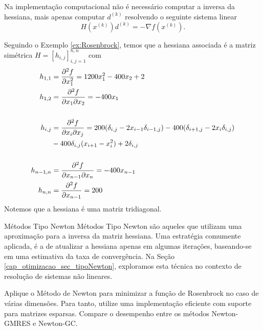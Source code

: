 \begin{obs}
  Na implementação computacional não é necessário computar a inversa da hessiana, mais apenas computar $d^{(k)}$ resolvendo o seguinte sistema linear
  \begin{equation}
    H(x^{(k)})d^{(k)} = -\nabla f(x^{(k)}).
  \end{equation}
\end{obs}

\begin{ex}\label{ex:optNewtonGC}
  Seguindo o Exemplo \ref{ex:Rosenbrock}, temos que a hessiana associada é a matriz simétrica $H = [h_{i,j}]_{i,j=1}^{n,n}$ com
  \begin{align}
    h_{1,1} &= \frac{\partial^2 f}{\partial x_1^2} = 1200x_1^2-400x_2+2\\
    h_{1,2} &= \frac{\partial^2 f}{\partial x_1\partial x_2} = -400x_1\\
            &~\nonumber\\
    h_{i,j} &= \frac{\partial^2 f}{\partial x_i\partial x_j} = 200(\delta_{i,j}-2x_{i-1}\delta_{i-1,j}) - 400(\delta_{i+1,j}-2x_i\delta_{i,j})\nonumber\\
            &- 400\delta_{i,j}(x_{i+1}-x_i^2) + 2\delta_{i,j}\\
            &~\nonumber\\
    h_{n-1,n} &= \frac{\partial^2 f}{\partial x_{n-1}\partial x_n} = -400x_{n-1}\\
    h_{n,n} &= \frac{\partial^2 f}{\partial x_{n-1}} = 200
  \end{align}
  Notemos que a hessiana é uma matriz tridiagonal.

    
\end{ex}

\begin{obs}{Métodos Tipo Newton}
  Métodos Tipo Newton são aqueles que utilizam uma aproximação para a inversa da matriz hessiana. Uma estratégia comumente aplicada, é a de atualizar a hessiana apenas em algumas iterações, baseando-se em uma estimativa da taxa de convergência. Na Seção \ref{cap_otimizacao_sec_tipoNewton}, exploramos esta técnica no contexto de resolução de sistemas não lineares.
\end{obs}

\begin{exer}
  Aplique o Método de Newton para minimizar a função de Rosenbrock no caso de várias dimensões. Para tanto, utilize uma implementação eficiente com suporte para matrizes esparsas. Compare o desempenho entre os métodos Newton-GMRES e Newton-GC. 
\end{exer}

